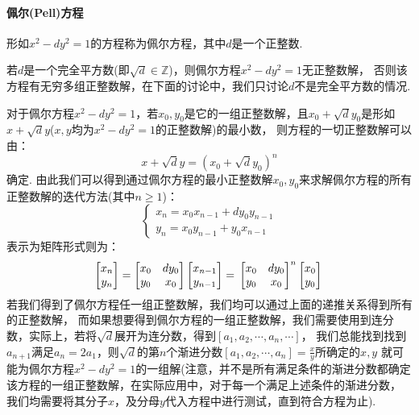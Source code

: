 \documentclass{article}
\numberwithin{equation}{subsubsection}
\begin{document}
\paragraph{\textbf{佩尔(Pell)方程}}
形如$x^2-dy^2=1$的方程称为佩尔方程，其中$d$是一个正整数.\par
若$d$是一个完全平方数(即$\sqrt{d}\in\mathbb{Z}$)，则佩尔方程$x^2-dy^2=1$无正整数解，
否则该方程有无穷多组正整数解，在下面的讨论中，我们只讨论$d$不是完全平方数的情况.\par
对于佩尔方程$x^2-dy^2=1$，若$x_0,y_0$是它的一组正整数解，且$x_0+\sqrt{d}y_0$是形如$x+\sqrt{d}y$($x,y$均为$x^2-dy^2=1$的正整数解)的最小数，
则方程的一切正整数解可以由：
\begin{equation}
    x+\sqrt{d}y=(x_0+\sqrt{d}y_0)^n
    \nonumber
\end{equation}
确定.
由此我们可以得到通过佩尔方程的最小正整数解$x_0,y_0$来求解佩尔方程的所有正整数解的迭代方法(其中$n\ge1$)：
\begin{equation}
    \begin{cases}
        x_{n}=x_0x_{n-1}+dy_0y_{n-1}\\
        y_{n}=x_0y_{n-1}+y_0x_{n-1}
    \end{cases}
    \nonumber
\end{equation}
表示为矩阵形式则为：
\begin{equation}
    \begin{bmatrix}
        x_n\\
        y_n
    \end{bmatrix}=
    \begin{bmatrix}
        x_0&dy_0\\
        y_0&x_0
    \end{bmatrix}
    \begin{bmatrix}
        x_{n-1}\\
        y_{n-1}
    \end{bmatrix}=\\
    \begin{bmatrix}
        x_0&dy_0\\
        y_0&x_0
    \end{bmatrix}^n
    \begin{bmatrix}
        x_{0}\\
        y_{0}
    \end{bmatrix}\\
    \nonumber
\end{equation}
若我们得到了佩尔方程任一组正整数解，我们均可以通过上面的递推关系得到所有的正整数解，
而如果想要得到佩尔方程的一组正整数解，我们需要使用到连分数，实际上，若将$\sqrt{d}$展开为连分数，得到$[a_1,a_2,\cdots,a_n,\cdots]$，
我们总能找到找到$a_{n+1}$满足$a_n=2a_1$，则$\sqrt{d}$的第$n$个渐进分数$[a_1,a_2,\cdots,a_{n}]=\frac{x}{y}$所确定的$x,y$
就可能为佩尔方程$x^2-dy^2=1$的一组解(注意，并不是所有满足条件的渐进分数都确定该方程的一组正整数解，在实际应用中，对于每一个满足上述条件的渐进分数，
我们均需要将其分子$x$，及分母$y$代入方程中进行测试，直到符合方程为止).
\end{document}
